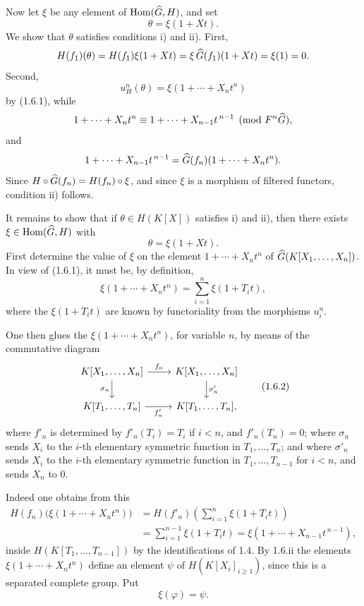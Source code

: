 \documentclass[11pt]{article}
\begin{document}
Now let \(\xi\) be any element of \(\operatorname{Hom}(\widehat G,H)\), and set
\[
  \theta=\xi(1+Xt).
\]
We show that \(\theta\) satisfies conditions i) and ii). First,
\[
  H(f_1)(\theta)=H(f_1)\xi(1+Xt)
  =\xi\,\widehat G(f_1)(1+Xt)=\xi(1)=0.
\]
Second,
\[
  u_H^n(\theta)=\xi(1+\cdots+X_nt^n)
\]
by (1.6.1), while
\[
  1+\cdots+X_nt^n\equiv 1+\cdots+X_{n-1}t^{\,n-1}
  \pmod{F^n\widehat G},
\]
and
\[
  1+\cdots+X_{n-1}t^{\,n-1}=\widehat G(f_n)(1+\cdots+X_nt^n).
\]
Since \(H\circ \widehat G(f_n)=H(f_n)\circ \xi\), and since \(\xi\) is a morphism of filtered functors, condition ii) follows.

It remains to show that if \(\theta\in H(K[X])\) satisfies i) and ii), then there exists \(\xi\in\operatorname{Hom}(\widehat G,H)\) with
\[
  \theta=\xi(1+Xt).
\]
First determine the value of \(\xi\) on the element \(1+\cdots+X_nt^n\) of \(\widehat G(K[X_1,\ldots,X_n])\). In view of (1.6.1), it must be, by definition,
\[
  \xi(1+\cdots+X_nt^n)
  =
  \sum_{i=1}^n \xi(1+T_it),
\]
where the \(\xi(1+T_it)\) are known by functoriality from the morphisms \(u_i^n\).

One then glues the \(\xi(1+\cdots+X_nt^n)\), for variable \(n\), by means of the commutative diagram
\[
\begin{tikzcd}
K[X_1,\ldots,X_n] \arrow[r,"f_n"] \arrow[d,"\sigma_n"'] &
K[X_1,\ldots,X_n] \arrow[d,"\sigma'_n"]\\
K[T_1,\ldots,T_n] \arrow[r,"f'_n"'] &
K[T_1,\ldots,T_n],
\end{tikzcd}
\tag{1.6.2}
\]
where \(f'_n\) is determined by \(f'_n(T_i)=T_i\) if \(i<n\), and \(f'_n(T_n)=0\); where \(\sigma_n\) sends \(X_i\) to the \(i\)-th elementary symmetric function in \(T_1,\ldots,T_n\); and where \(\sigma'_n\) sends \(X_i\) to the \(i\)-th elementary symmetric function in \(T_1,\ldots,T_{n-1}\) for \(i<n\), and sends \(X_n\) to \(0\).

Indeed one obtains from this
\[
\begin{aligned}
H(f_n)\bigl(\xi(1+\cdots+X_nt^n)\bigr)
&=H(f'_n)\left(\sum_{i=1}^n \xi(1+T_it)\right)\\
&=\sum_{i=1}^{n-1}\xi(1+T_it)
   =\xi(1+\cdots+X_{n-1}t^{\,n-1}),
\end{aligned}
\]
inside \(H(K[T_1,\ldots,T_{n-1}])\) by the identifications of 1.4. By 1.6.ii the elements \(\xi(1+\cdots+X_nt^n)\) define an element \(\psi\) of \(H(K[X_i]_{i\geq 1})\), since this is a separated complete group. Put
\[
  \xi(\varphi)=\psi .
\]
\end{document}
